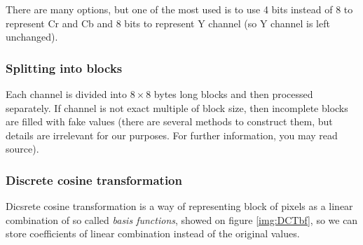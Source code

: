 There are many options, but one of the most used is to use 4 bits instead of 8
to represent Cr and Cb and 8 bits to represent Y channel (so Y channel is left unchanged).

\subsubsection{Splitting into blocks}

Each channel is divided into $8 \times 8$ bytes long blocks and 
then processed separately. If channel is not exact multiple of block size,
then incomplete blocks are filled with fake values (there are several
methods to construct them, but details are irrelevant for our purposes. 
For further information, you may read \TODO source).

\subsubsection{Discrete cosine transformation}

Dicsrete cosine transformation is a way of representing block of pixels as 
a linear combination of so called \textit{basis functions}, showed on figure \ref{img:DCTbf},
so we can store coefficients of linear combination instead of the original values.


